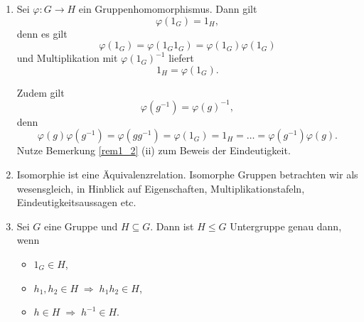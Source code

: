 \begin{rem}
	\begin{enumerate}[label=(\roman*)]
		\item Sei $\varphi \colon G \to H$ ein Gruppenhomomorphismus. Dann gilt
		\[\varphi(1_G) = 1_H,\]
		denn es gilt
		\[\varphi(1_G) = \varphi(1_G 1_G) = \varphi(1_G) \varphi(1_G)\]
		und Multiplikation mit $\varphi(1_G)^{-1}$ liefert 
		\[1_H = \varphi(1_G).\]
		
		Zudem gilt
		\[\varphi(g^{-1}) = \varphi(g)^{-1},\]
		denn
		\[\varphi(g) \varphi(g^{-1}) = \varphi(gg^{-1}) = \varphi(1_G) = 1_H = \dots = \varphi(g^{-1}) \varphi(g).\]
		Nutze Bemerkung \ref{rem1_2} (ii) zum Beweis der Eindeutigkeit.
		
		\item Isomorphie ist eine Äquivalenzrelation. Isomorphe Gruppen betrachten wir als wesensgleich, in Hinblick auf Eigenschaften, Multiplikationstafeln, Eindeutigkeitsaussagen etc.
		
		\item Sei $G$ eine Gruppe und $H \subseteq G$. Dann ist $H \leq G$ Untergruppe genau dann, wenn 
		\begin{itemize}
			\item $1_G \in H$,
			\item $h_1, h_2 \in H \;\Rightarrow\; h_1h_2 \in H$,
			\item $h \in H \;\Rightarrow\; h^{-1} \in H$.
		\end{itemize}
	\end{enumerate}
\end{rem}

